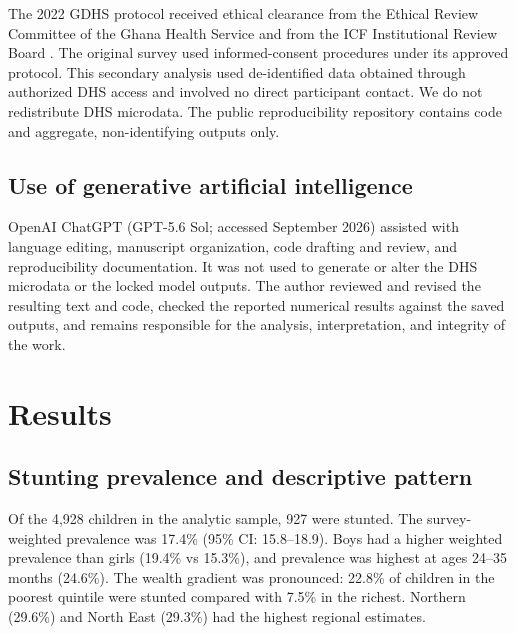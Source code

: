 \documentclass[11pt]{article}
\begin{document}
The 2022 GDHS protocol received ethical clearance from the Ethical Review Committee of the Ghana Health Service and from the ICF Institutional Review Board \citep{GSSICF2024}. The original survey used informed-consent procedures under its approved protocol. This secondary analysis used de-identified data obtained through authorized DHS access and involved no direct participant contact. We do not redistribute DHS microdata. The public reproducibility repository contains code and aggregate, non-identifying outputs only.

\subsection{Use of generative artificial intelligence}

OpenAI ChatGPT (GPT-5.6 Sol; accessed September 2026) assisted with language editing, manuscript organization, code drafting and review, and reproducibility documentation. It was not used to generate or alter the DHS microdata or the locked model outputs. The author reviewed and revised the resulting text and code, checked the reported numerical results against the saved outputs, and remains responsible for the analysis, interpretation, and integrity of the work.

\section{Results}

\subsection{Stunting prevalence and descriptive pattern}

Of the 4,928 children in the analytic sample, 927 were stunted. The survey-weighted prevalence was 17.4\% (95\% CI: 15.8--18.9). Boys had a higher weighted prevalence than girls (19.4\% vs 15.3\%), and prevalence was highest at ages 24--35 months (24.6\%). The wealth gradient was pronounced: 22.8\% of children in the poorest quintile were stunted compared with 7.5\% in the richest. Northern (29.6\%) and North East (29.3\%) had the highest regional estimates.
\end{document}
